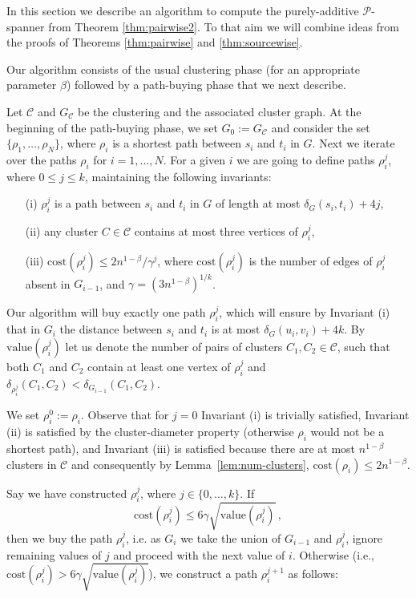 \documentclass[a4paper,11pt]{article}
\theoremstyle{definition}
\newcommand{\dist}{\delta}
\newcommand{\cost}{\mathrm{cost}}
\newcommand{\val}{\mathrm{value}}
\newcommand{\cP}{\mathcal{P}}
\newcommand{\cC}{\mathcal{C}}
\begin{document}
In this section we describe an algorithm to compute the purely-additive $\cP$-spanner from Theorem \ref{thm:pairwise2}. To that aim we will combine ideas from the proofs of Theorems \ref{thm:pairwise} and \ref{thm:sourcewise}.

Our algorithm consists of the usual clustering phase (for an appropriate parameter $\beta$) followed by a path-buying phase that we next describe. 

Let $\cC$ and $G_\cC$ be the clustering and the associated cluster graph. At the beginning of the path-buying phase, we set $G_0 := G_\cC$ and consider the set $\{\rho_1,\ldots,\rho_N\}$,
where $\rho_i$ is a shortest path between $s_i$ and $t_i$ in $G$.
Next we iterate over the paths $\rho_i$ for $i=1,\ldots,N$.
For a given $i$ we are going to define paths $\rho_i^j$, where $0 \le j \le k$,
maintaining the following invariants:\smallskip

\begin{itemize}
  \item[(i)] $\rho_i^j$ is a path between $s_i$ and $t_i$ in $G$ of 
  length at most $\dist_G(s_i,t_i)+4j$,
  \item[(ii)] any cluster $C \in \cC$ contains at most three vertices of $\rho_i^j$,
  \item[(iii)] $\cost(\rho_i^j) \le 2n^{1-\beta} / \gamma^j$, where $\cost(\rho_i^j)$ is the number of edges of $\rho_i^j$ absent in $G_{i-1}$,
and $\gamma=(3n^{1-\beta})^{1/k}$.
\end{itemize}

\smallskip\noindent Our algorithm will buy exactly one path $\rho_i^j$, which will ensure by Invariant (i) that 
in $G_{i}$ the distance between $s_i$ and $t_i$ is at most $\dist_G(u_i,v_i)+4k$.
By $\val(\rho_i^j)$ let us denote the number 
of pairs of clusters $C_1,C_2 \in \cC$, such that both $C_1$ and $C_2$ contain at
least one vertex of $\rho_i^j$ and $\dist_{\rho_i^j}(C_1,C_2) < \dist_{G_{i-1}}(C_1,C_2)$.

We set $\rho_i^0 := \rho_i$.
Observe that for $j=0$ Invariant (i) is trivially satisfied,
Invariant (ii) is satisfied by the cluster-diameter property 
(otherwise $\rho_i$ would not be a shortest path),
and Invariant (iii) is satisfied because there are at most $n^{1-\beta}$ clusters in $\cC$
and consequently by Lemma~\ref{lem:num-clusters}, $\cost(\rho_i) \le 2n^{1-\beta}$. 

Say we have constructed $\rho_i^j$, where $j\in \{0,\ldots,k\}$.
If
$$\cost(\rho_i^j) \le 6\gamma\sqrt{\val(\rho_i^j)}\,,$$
then we buy the path $\rho_i^j$,
i.e. as $G_i$ we take the union of $G_{i-1}$ and $\rho_i^j$,
ignore remaining values of $j$ and proceed with the next value of $i$.
Otherwise (i.e., $\cost(\rho_i^j) > 6\gamma\sqrt{\val(\rho_i^j)}$), 
we construct a path $\rho_i^{j+1}$ as follows:
\end{document}
